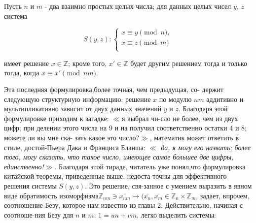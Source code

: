 \begin{thm}

  Пусть $n$ и $m$ - два взаимно простых целых числа; для данных целых \linebreak чисел $y$, $z$ система

\begin{equation*}
S(y, z) : 
\begin{cases}
    x \equiv y\pmod{n}, \\
    x \equiv z\pmod{m} \\
\end{cases}
\end{equation*}

имеет решение $x \in \mathbb{Z}$; кроме того, $x'\in \mathbb{Z}$ будет другим решением тогда \linebreak и только тогда, когда $x \equiv x'\pmod{nm}$.
\end{thm}
  Эта последняя формулировка,более точная, чем предыдущая, со- \linebreak держит следующую структурную информацию: решение $x$ по модулю \linebreak $nm$ аддитивно и мультипликативно зависит от двух данных значений $y$ и $z$.
  Благодаря этой формулировке приходим к загадке: $\ll$я выбрал чи-\linebreak сло не более, чем из двух цифр; при делении этого числа на 9 и на получил соответственно остатки 4 и 8; можете ли вы мне ска- \linebreak зать какое это число?$\gg$, математик может ответить в стиле, достой-\linebreak Пьера Дака и Франциса Бланша: \textit{$\ll$ да, я могу его назвать; более
того, могу сказать, что такое число, имеющее самое большее две \linebreak цифры, единственно!$\gg$}. Благодаря этой тираде, читатель уже понял,\linebreak что формулировка китайской теоремы, приведенные выше, недоста-\linebreak точны для эффективного решения системы $S(y,z)$. Это решение, свя-\linebreak занное с умением выразить в явном виде обратимость изоморфизма\linebreak $\mathbb{Z}_{nm}\ni \overline{x_{nm}}\mapsto(\overline{x_n},\overline{x_m}\in \mathbb{Z}_n \times\mathbb{Z}_m$, задает, впрочем, соотношение Безу, \linebreak которое нам известно из главы 2. Действительно, начиная с соотноше-\linebreak ния Безу для $n$ и $m$: $1=un+vm$, легко выделить системы:
